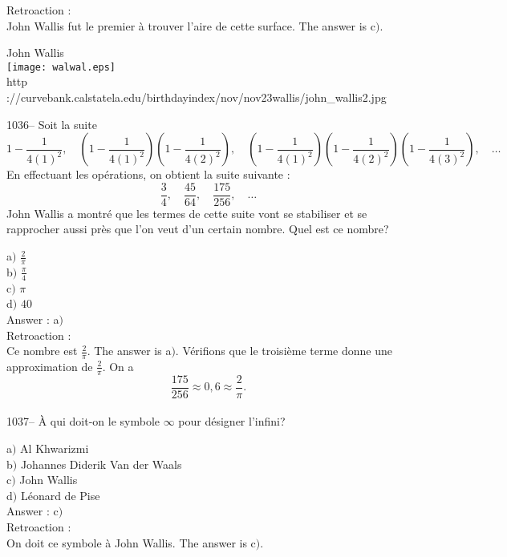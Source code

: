 ﻿\documentclass[letterpaper, 12pt]{article}
\begin{document}
Retroaction :\\
John Wallis fut le premier \`a trouver l'aire de cette surface.
The answer is c$)$.\\

        \begin{center}
        John Wallis\\
    \texttt{[image: walwal.eps]}\\
        {\footnotesize http
://curvebank.calstatela.edu/birthdayindex/nov/nov23wallis/john\_wallis2.jpg}
    \end{center}

1036-- Soit la suite
$$\displaystyle{1-\frac1{4(1)^2},\quad\left(1-\frac1{4(1)^2}\right)\left(1-\frac1{4(2)^2}\right),\quad
\left(1-\frac1{4(1)^2}\right)\left(1-\frac1{4(2)^2}\right)\left(1-\frac1{4(3)^2}\right),\quad\ldots}$$
En effectuant les op\'erations, on obtient la suite suivante :
$$\displaystyle{\frac34,\quad\frac{45}{64},\quad\frac{175}{256},\quad\ldots}$$
John Wallis a montr\'e que les termes de cette suite vont se
stabiliser et se rapprocher aussi pr\`es que l'on veut d'un certain
nombre. Quel est ce nombre?

a$)$ $\frac2{\pi}$ \\[2mm]
b$)$ $\frac{\pi}4$  \\[2mm]
c$)$ $\pi$  \\[2mm]
d$)$ $40$\\

Answer : a$)$\\

Retroaction :\\
Ce nombre est $\frac2{\pi}$. The answer is a$)$. V\'erifions que
le troisi\`eme terme donne une approximation de $\frac2{\pi}$. On a
$$\displaystyle{\frac{175}{256}\approx0,6\approx\frac2{\pi}}.$$
\\

1037-- \`A qui doit-on le symbole $\infty$ pour d\'esigner l'infini?

a$)$ Al Khwarizmi \\
b$)$ Johannes Diderik Van der Waals   \\
c$)$ John Wallis  \\
d$)$ L\'eonard de Pise \\

Answer : c$)$\\

Retroaction :\\
On doit ce symbole \`a John Wallis.
The answer is c$)$.\\
\end{document}
